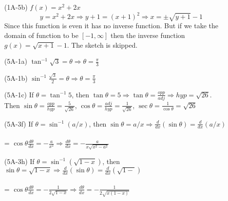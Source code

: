 \documentclass{article}
\begin{document}
\begin{itemize}
    \item[(1A-5b)] $f(x) = x^2 + 2x$
    \[ y = x^2 + 2x \Rightarrow y + 1 = (x+1)^2  \Rightarrow x = \pm \sqrt{y+1} - 1 \]
    Since this function is even it has no inverse function. But if we take the domain of function to be $[-1, \infty]$ then the inverse function $g(x) = \sqrt{x+1} - 1$. The sketch is skipped.
    
    \item[(5A-1a)] $\tan^{-1}{\sqrt{3}} = \theta \Rightarrow \theta = \frac{\pi}{3}$
    
    \item[(5A-1b)] $\sin^{-1}{\frac{\sqrt{3}}{2}} = \theta \Rightarrow \theta = \frac{\pi}{3}$

    \item[(5A-1c)] If $\theta = \tan^{-1} 5$, then $\tan{\theta} = 5 \Rightarrow \tan{\theta} = \frac{opp}{adj} \Rightarrow hyp = \sqrt{26}$. \\ Then $\sin{\theta} = \frac{opp}{hyp} = \frac{5}{\sqrt{26}}$, $\cos{\theta} = \frac{adj}{hyp} = \frac{1}{\sqrt{26}}$, $\sec{\theta} = \frac{1}{\cos{\theta}} = \sqrt{26}$

    \item[(5A-3f)] If $\theta = \sin^{-1}{(a/x)}$, then $\sin \theta = a/x \Rightarrow \frac{d}{dx}(\sin \theta) = \frac{d}{dx} (a/x)$ \\ \\ = $\cos \theta \frac{d\theta}{dx} = -\frac{a}{x^2} \Rightarrow \frac{d\theta}{dx} = -\frac{a}{x\sqrt{x^2-a^2}}$

    \item[(5A-3h)] If $\theta = \sin^{-1}{(\sqrt{1-x})}$, then $\sin \theta = \sqrt{1-x} \Rightarrow \frac{d}{dx}(\sin \theta) = \frac{d}{dx} (\sqrt{1-})$ \\ \\ = $\cos \theta \frac{d\theta}{dx} = -\frac{1}{2\sqrt{1-x}} \Rightarrow \frac{d\theta}{dx} = -\frac{1}{2\sqrt{x(1-x)}}$
\end{itemize}
\end{document}
